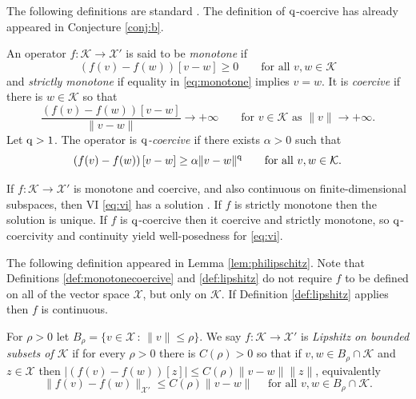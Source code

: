 \documentclass[hidelinks,onefignum,onetabnum,final]{siamart220329}  %
\newcommand{\cK}{\mathcal{K}}
\newcommand{\cX}{\mathcal{X}}
\newcommand{\qq}{{\text{\textnormal{q}}}}
\begin{document}
The following definitions are standard \cite[Chapter III]{KinderlehrerStampacchia1980}.  The definition of $\qq$-coercive has already appeared in Conjecture \ref{conj:b}.

\begin{definition} \label{def:monotonecoercive}
An operator $f:\cK \to \cX'$ is said to be \emph{monotone} if
\begin{equation}
\left(f(v)-f(w)\right)[v-w] \ge 0 \qquad \text{for all } v,w \in \cK \label{eq:monotone}
\end{equation}
and \emph{strictly monotone} if equality in \eqref{eq:monotone} implies $v=w$.  It is \emph{coercive} if there is $w\in \cK$ so that
\begin{equation}
\frac{\left(f(v)-f(w)\right)[v-w]}{\|v-w\|} \to +\infty \qquad \text{for } v \in \cK \text{ as } \|v\| \to +\infty. \label{eq:coercive}
\end{equation}
Let $\qq>1$.  The operator is \emph{$\qq$-coercive \cite{Bueler2021conservation}} if there exists $\alpha>0$ such that
\begin{equation}
\left(f(v)-f(w)\right)[v-w] \ge \alpha \|v-w\|^\qq \qquad \text{for all } v,w \in \cK. \label{eq:qcoercive}
\end{equation}
\end{definition}

If $f:\cK \to \cX'$ is monotone and coercive, and also continuous on finite-dimensional subspaces, then VI \eqref{eq:vi} has a solution \cite[Corollary III.1.8]{KinderlehrerStampacchia1980}.  If $f$ is strictly monotone then the solution is unique.  If $f$ is $\qq$-coercive then it coercive and strictly monotone, so $\qq$-coercivity and continuity yield well-posedness for \eqref{eq:vi}.

The following definition appeared in Lemma \ref{lem:philipschitz}.  Note that Definitions \ref{def:monotonecoercive} and \ref{def:lipshitz} do not require $f$ to be defined on all of the vector space $\cX$, but only on $\cK$.  If Definition \ref{def:lipshitz} applies then $f$ is continuous.

\begin{definition} \label{def:lipshitz}
For $\rho>0$ let $B_\rho = \{v\in \cX\,:\,\|v\|\le \rho\}$.  We say $f:\cK \to \cX'$ is \emph{Lipshitz on bounded subsets of $\cK$} if for every $\rho>0$ there is $C(\rho)>0$ so that if $v,w \in B_\rho \cap \cK$ and $z\in\cX$ then $|\left(f(v)-f(w)\right)[z]| \le C(\rho) \|v-w\| \|z\|$, equivalently
\begin{equation}
\|f(v)-f(w)\|_{\cX'} \le C(\rho) \|v-w\| \quad \text{ for all } v,w \in B_\rho \cap \cK.  \label{eq:liponbounded}
\end{equation}
\end{definition}
\end{document}
